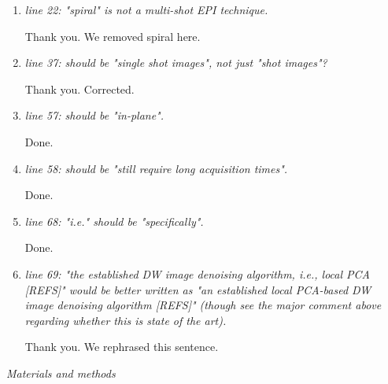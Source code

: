 \documentclass[a4paper,11pt,twoside]{report}
\begin{document}
\begin{enumerate}[resume]
    \item \textit{line 22: "spiral" is not a multi-shot EPI technique.}

    \hspace{1em} Thank you. We removed spiral here.

    \item \textit{line 37: should be "single shot images", not just "shot images"?}

    \hspace{1em} Thank you. Corrected.

    \item \textit{line 57: should be "in-plane".}

    \hspace{1em} Done.

    \item \textit{line 58: should be "still require long acquisition times".}

    \hspace{1em} Done.

    \item \textit{line 68: "i.e." should be "specifically".}

    \hspace{1em} Done.

    \item \textit{line 69: "the established DW image denoising algorithm, i.e., local PCA [REFS]" would be better written as "an established local PCA-based DW image denoising algorithm [REFS]" (though see the major comment above regarding whether this is state of the art).}

    \hspace{1em} Thank you. We rephrased this sentence.

\end{enumerate}


\noindent \textit{Materials and methods}
\end{document}
